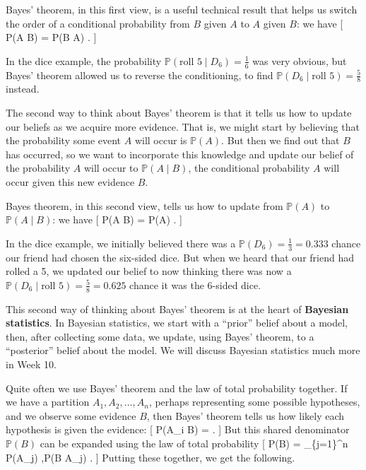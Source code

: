 \documentclass[
  letterpaper,
]{report}
\theoremstyle{definition}
\theoremstyle{definition}
\theoremstyle{remark}
\begin{document}
Bayes' theorem, in this first view, is a useful technical result that
helps us switch the order of a conditional probability from \(B\) given
\(A\) to \(A\) given \(B\): we have {[} \mathbb P(A \mid B) =
 \times \mathbb P(B \mid A) . {]}

In the dice example, the probability
\(\mathbb P(\text{roll 5} \mid D_6) = \frac16\) was very obvious, but
Bayes' theorem allowed us to reverse the conditioning, to find
\(\mathbb P(D_6 \mid \text{roll 5}) = \frac58\) instead.

The second way to think about Bayes' theorem is that it tells us how to
update our beliefs as we acquire more evidence. That is, we might start
by believing that the probability some event \(A\) will occur is
\(\mathbb P(A)\). But then we find out that \(B\) has occurred, so we
want to incorporate this knowledge and update our belief of the
probability \(A\) will occur to \(\mathbb P(A \mid B)\), the conditional
probability \(A\) will occur given this new evidence \(B\).

Bayes theorem, in this second view, tells us how to update from
\(\mathbb P(A)\) to \(\mathbb P(A \mid B)\): we have {[} \mathbb P(A
\mid B) = \mathbb P(A) \times {} .
{]}

In the dice example, we initially believed there was a
\(\mathbb P(D_6) = \frac13 = 0.333\) chance our friend had chosen the
six-sided dice. But when we heard that our friend had rolled a 5, we
updated our belief to now thinking there was now a
\(\mathbb P(D_6 \mid \text{roll 5}) =\frac58 = 0.625\) chance it was the
6-sided dice.

This second way of thinking about Bayes' theorem is at the heart of
\textbf{Bayesian statistics}. In Bayesian statistics, we start with a
``prior'' belief about a model, then, after collecting some data, we
update, using Bayes' theorem, to a ``posterior'' belief about the model.
We will discuss Bayesian statistics much more in Week 10.

Quite often we use Bayes' theorem and the law of total probability
together. If we have a partition \(A_1, A_2, \dots, A_n\), perhaps
representing some possible hypotheses, and we observe some evidence
\(B\), then Bayes' theorem tells us how likely each hypothesis is given
the evidence: {[} \mathbb P(A\_i \mid B) =
 . {]} But
this shared denominator \(\mathbb P(B)\) can be expanded using the law
of total probability {[} \mathbb P(B) = \sum\_\{j=1\}\^{}n
\mathbb P(A\_j) ,\mathbb P(B \mid A\_j) . {]} Putting these together, we
get the following.
\end{document}
